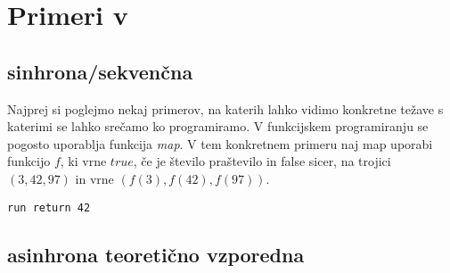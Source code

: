 \section{Primeri v \aeff{}} \label{sec:primeri-aeff}

\subsection{sinhrona/sekvenčna}
Najprej si poglejmo nekaj primerov, na katerih lahko vidimo konkretne težave s katerimi se lahko srečamo ko programiramo. 
V funkcijskem programiranju se pogosto uporablja funkcija \emph{map}. V tem konkretnem primeru naj map uporabi funkcijo $f$, ki vrne $true$, če je število praštevilo in false sicer, na trojici $(3,42,97)$ in vrne $(f(3),f(42),f(97))$. 


 

\begin{lstlisting}[caption={TODO},label={prog:primer-map-seq}]
run return 42
\end{lstlisting}

\subsection{asinhrona teoretično vzporedna}



